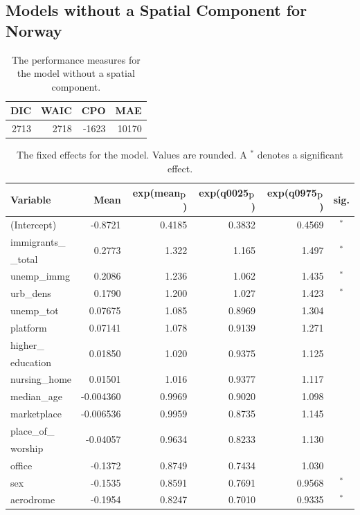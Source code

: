 \subsection{Models without a Spatial Component for Norway}
\begin{table}[H] 
\caption{The performance measures for the model without a spatial component. \label{allNorway_nospatial}}
\begin{tabular}{r r r r}
\toprule\textbf{DIC}	& \textbf{WAIC} & \textbf{CPO} & \textbf{MAE}\\
\midrule
2713 & 2718 & -1623 & 10170 \\
\bottomrule
\end{tabular}
\end{table} 
\begin{table}[H]
\caption{The fixed effects for the model. Values are rounded. A $^*$ denotes a significant effect. \label{fixedAllNorway_nospatial}}
\begin{tabular}{l r r r r c}
\toprule
\textbf{Variable}	& \textbf{Mean}	& \textbf{exp(mean$_{\hbox{p}}$)} & \textbf{exp(q0025$_{\hbox{p}}$)} & \textbf{exp(q0975$_{\hbox{p}}$)} & \textbf{sig.}\\
\midrule
(Intercept) & -0.8721 & 0.4185 & 0.3832 & 0.4569 & $^*$ \\
immigrants\_ & \multirow{2}{*}{0.2773}& \multirow{2}{*}{1.322}& \multirow{2}{*}{1.165}& \multirow{2}{*}{1.497}& \multirow{2}{*}{$^*$}\\
\_total \\
unemp\_immg & 0.2086 & 1.236 & 1.062 & 1.435 & $^*$ \\
urb\_dens & 0.1790 & 1.200 & 1.027 & 1.423 & $^*$ \\
unemp\_tot & 0.07675 & 1.085 & 0.8969 & 1.304 \\
platform & 0.07141 & 1.078 & 0.9139 & 1.271 \\
higher\_ & \multirow{2}{*}{0.01850}& \multirow{2}{*}{1.020}& \multirow{2}{*}{0.9375}& \multirow{2}{*}{1.125}\\ 
education \\
nursing\_home & 0.01501 & 1.016 & 0.9377 & 1.117 \\
median\_age & -0.004360  & 0.9969 & 0.9020 & 1.098 \\
marketplace & -0.006536 & 0.9959 & 0.8735 & 1.145 \\
place\_of\_ & \multirow{2}{*}{-0.04057}& \multirow{2}{*}{0.9634}& \multirow{2}{*}{0.8233}& \multirow{2}{*}{1.130} \\
worship \\
office & -0.1372 & 0.8749 & 0.7434 & 1.030 \\
sex & -0.1535 & 0.8591 & 0.7691 & 0.9568 & $^*$ \\
aerodrome & -0.1954 & 0.8247 & 0.7010 & 0.9335 & $^*$ \\
\bottomrule
\end{tabular}
\end{table}
\clearpage
